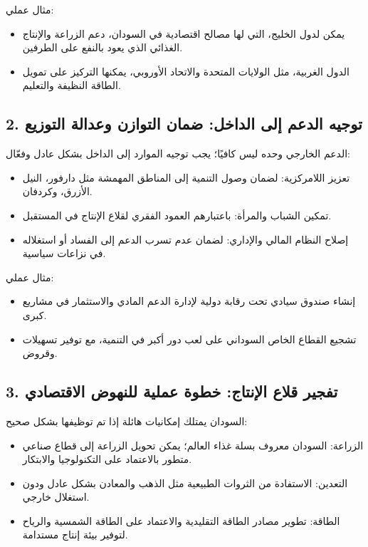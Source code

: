 \documentclass[12pt]{article}
\begin{document}
مثال عملي:
\begin{itemize}
    \item يمكن لدول الخليج، التي لها مصالح اقتصادية في السودان، دعم الزراعة والإنتاج الغذائي الذي يعود بالنفع على الطرفين.
    \item الدول الغربية، مثل الولايات المتحدة والاتحاد الأوروبي، يمكنها التركيز على تمويل الطاقة النظيفة والتعليم.
\end{itemize}

\subsection*{2. توجيه الدعم إلى الداخل: ضمان التوازن وعدالة التوزيع}
الدعم الخارجي وحده ليس كافيًا؛ يجب توجيه الموارد إلى الداخل بشكل عادل وفعّال:
\begin{itemize}
    \item تعزيز اللامركزية: لضمان وصول التنمية إلى المناطق المهمشة مثل دارفور، النيل الأزرق، وكردفان.
    \item تمكين الشباب والمرأة: باعتبارهم العمود الفقري لقلاع الإنتاج في المستقبل.
    \item إصلاح النظام المالي والإداري: لضمان عدم تسرب الدعم إلى الفساد أو استغلاله في نزاعات سياسية.
\end{itemize}

مثال عملي:
\begin{itemize}
    \item إنشاء صندوق سيادي تحت رقابة دولية لإدارة الدعم المادي والاستثمار في مشاريع كبرى.
    \item تشجيع القطاع الخاص السوداني على لعب دور أكبر في التنمية، مع توفير تسهيلات وقروض.
\end{itemize}

\subsection*{3. تفجير قلاع الإنتاج: خطوة عملية للنهوض الاقتصادي}
السودان يمتلك إمكانيات هائلة إذا تم توظيفها بشكل صحيح:
\begin{itemize}
    \item الزراعة: السودان معروف بسلة غذاء العالم؛ يمكن تحويل الزراعة إلى قطاع صناعي متطور بالاعتماد على التكنولوجيا والابتكار.
    \item التعدين: الاستفادة من الثروات الطبيعية مثل الذهب والمعادن بشكل عادل ودون استغلال خارجي.
    \item الطاقة: تطوير مصادر الطاقة التقليدية والاعتماد على الطاقة الشمسية والرياح لتوفير بيئة إنتاج مستدامة.
\end{itemize}
\end{document}
